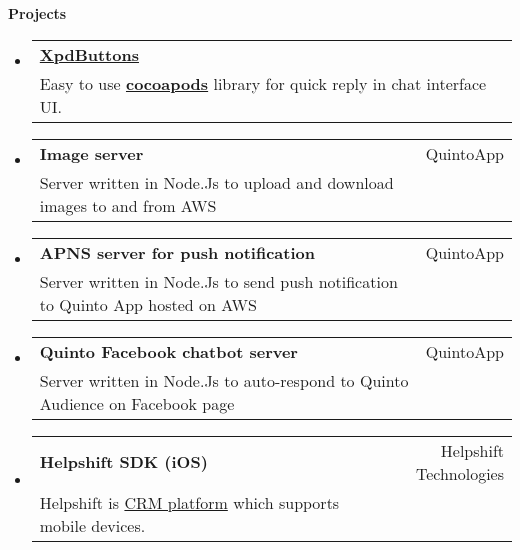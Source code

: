 \documentclass[letterpaper,11pt]{article}
\makeatletter
\newcommand{\resheading}[1]{{\large \colorbox{mygrey}{\begin{minipage}{\textwidth}{\textbf{#1 \vphantom{p\^{E}}}}\end{minipage}}}}
\newcommand{\ressubheading}[3]{
\begin{tabular*}{6.5in}{l@{\extracolsep{\fill}}r}
	\textbf{#1} & #2\\
	{#3} \\
\end{tabular*}\vspace{-6pt}
}
\makeatother
\begin{document}
\resheading{Projects}
\begin{itemize}
\item 
	\ressubheading{\href{https://cocoapods.org/pods/XpdButtons}{XpdButtons}}{}{Easy to use \href{https://cocoapods.org/pods/XpdButtons}{\textbf{cocoapods}} library for quick reply in chat interface UI.}
\item 
	\ressubheading{Image server}{QuintoApp}{Server written in Node.Js to upload and download images to and from AWS}
\item
	\ressubheading{APNS server for push notification}{QuintoApp}{Server written in Node.Js to send push notification to Quinto App hosted on AWS}
\item
	\ressubheading{Quinto Facebook chatbot server}{QuintoApp}{Server written in Node.Js to auto-respond to Quinto Audience on Facebook page}	
\item
	\ressubheading{Helpshift SDK (iOS)}{Helpshift Technologies}{Helpshift is \href{https://en.wikipedia.org/wiki/Customer_relationship_management}{CRM platform} which supports mobile devices.}
 


\end{itemize}
\end{document}
